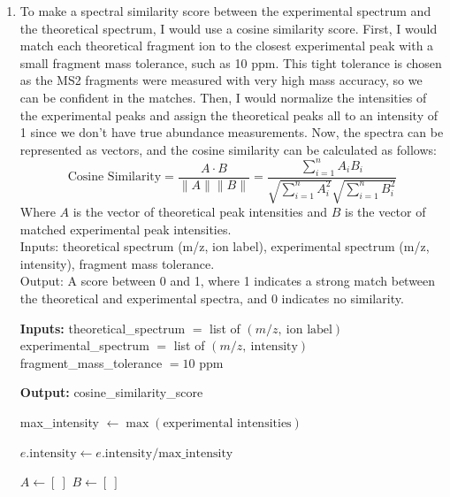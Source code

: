 \documentclass{article}
\begin{document}
\begin{enumerate}[label=(\alph*)]
    \item To make a spectral similarity score between the experimental spectrum and the theoretical spectrum, I would use a cosine similarity score.
    First, I would match each theoretical fragment ion to the closest experimental peak with a small fragment mass tolerance, such as 10 ppm. This tight tolerance is chosen as the MS2 fragments were measured with very high mass accuracy, so we can be confident in the matches. 
    Then, I would normalize the intensities of the experimental peaks and assign the theoretical peaks all to an intensity of 1 since we don't have true abundance measurements. 
    Now, the spectra can be represented as vectors, and the cosine similarity can be calculated as follows:
    $$\text{Cosine Similarity} = \frac{A \cdot B}{\|A\| \|B\|} = \frac{\sum_{i=1}^{n} A_i B_i}{\sqrt{\sum_{i=1}^{n} A_i^2} \sqrt{\sum_{i=1}^{n} B_i^2}}$$
    Where $A$ is the vector of theoretical peak intensities and $B$ is the vector of matched experimental peak intensities.\\
    Inputs: theoretical spectrum (m/z, ion label), experimental spectrum (m/z, intensity), fragment mass tolerance.\\
    Output: A score between 0 and 1, where 1 indicates a strong match between the theoretical and experimental spectra, and 0 indicates no similarity.
    \begin{algorithm}[H]
    \caption{Cosine Similarity Scoring}
    \begin{algorithmic}[1]

    \State \textbf{Inputs:}
    \State \hspace{1em} theoretical\_spectrum $=$ list of $(m/z,\ \text{ion label})$
    \State \hspace{1em} experimental\_spectrum $=$ list of $(m/z,\ \text{intensity})$
    \State \hspace{1em} fragment\_mass\_tolerance $= 10$ ppm

    \State \textbf{Output:}
    \State \hspace{1em} cosine\_similarity\_score

    \State max\_intensity $\gets \max(\text{experimental intensities})$

        \State $e.\text{intensity} \gets e.\text{intensity} / \text{max\_intensity}$
    \EndFor

    \State $A \gets [\ ]$
    \State $B \gets [\ ]$



\end{algorithmic}
\end{algorithm}
\end{enumerate}
\end{document}
